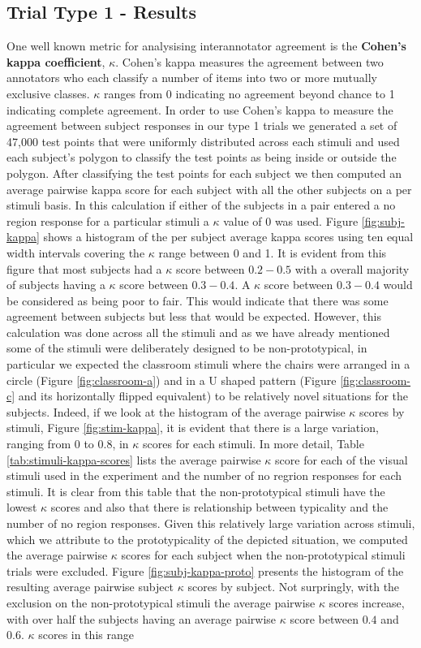 \documentclass[11pt,letterpaper]{article}
\begin{document}
\subsection{Trial Type 1 - Results}
One well known metric for analysising interannotator agreement is the \textbf{Cohen's kappa coefficient}, $\kappa$. Cohen's kappa measures the agreement between two annotators who each classify a number of items into two or more mutually exclusive classes. $\kappa$ ranges from 0 indicating no agreement beyond chance to 1 indicating complete agreement. In order to use Cohen's kappa to measure the agreement between subject responses in our type 1 trials we generated a set of 47,000 test points that were uniformly distributed across each stimuli and used each subject's polygon to classify the test points as being inside or outside the polygon. After classifying the test points for each subject we then computed an average pairwise kappa score for each subject with all the other subjects on a per stimuli basis. In this calculation if either of the subjects in a pair entered a no region response for a particular stimuli a $\kappa$ value of 0 was used. Figure \ref{fig:subj-kappa} shows a histogram of the per subject average kappa scores using ten equal width intervals covering the $\kappa$ range between 0 and 1.  It is evident from this figure that most subjects had a $\kappa$ score between $0.2-0.5$ with a overall majority of subjects having a $\kappa$ score between $0.3-0.4$. A $\kappa$ score between $0.3-0.4$ would be considered as being poor to fair. This would indicate that there was some agreement between subjects but less that would be expected. However, this calculation was done across all the stimuli and as we have already mentioned some of the stimuli were deliberately designed to be non-prototypical, in particular we expected the classroom stimuli where the chairs were arranged in a circle (Figure \ref{fig:classroom-a}) and in a U shaped pattern (Figure \ref{fig:classroom-c} and its horizontally flipped equivalent) to be relatively novel situations for the subjects. Indeed, if we look at the histogram of the average pairwise $\kappa$ scores by stimuli, Figure \ref{fig:stim-kappa}, it is evident that there is a large variation, ranging from $0$ to $0.8$, in $\kappa$ scores for each stimuli. In more detail, Table \ref{tab:stimuli-kappa-scores} lists the average pairwise $\kappa$ score for each of the visual stimuli used in the experiment and the number of no regrion responses for each stimuli. It is clear from this table that the non-prototypical stimuli have the lowest $\kappa$ scores and also that there is relationship between typicality and the number of no region responses. Given this relatively large variation across stimuli, which we attribute to the prototypicality of the depicted situation, we computed the average pairwise $\kappa$ scores for each subject when the non-prototypical stimuli trials were excluded. Figure \ref{fig:subj-kappa-proto} presents the histogram of the resulting average pairwise subject  $\kappa$ scores by subject. Not surpringly, with the exclusion on the non-prototypical stimuli the average pairwise $\kappa$ scores increase, with over half the subjects having an average pairwise $\kappa$ score between $0.4$ and $0.6$. $\kappa$ scores in this range 
\end{document}
